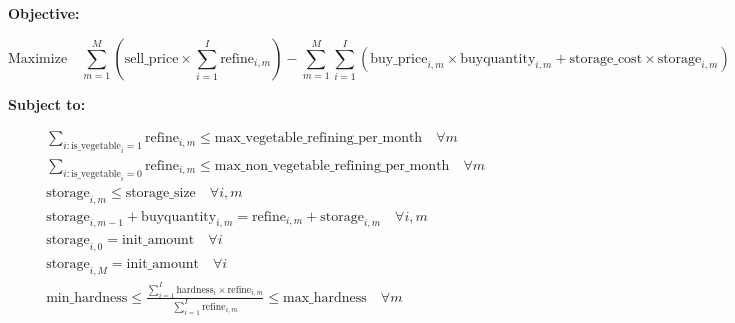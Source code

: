 \documentclass{article}
\begin{document}
\textbf{Objective:}

\[
\text{Maximize} \quad \sum_{m=1}^{M} \left( \text{sell\_price} \times \sum_{i=1}^{I} \text{refine}_{i,m} \right) - \sum_{m=1}^{M} \sum_{i=1}^{I} \left( \text{buy\_price}_{i,m} \times \text{buyquantity}_{i,m} + \text{storage\_cost} \times \text{storage}_{i,m} \right)
\]

\textbf{Subject to:}

\begin{align}
& \sum_{i: \text{is\_vegetable}_i = 1} \text{refine}_{i,m} \leq \text{max\_vegetable\_refining\_per\_month} \quad \forall m \\
& \sum_{i: \text{is\_vegetable}_i = 0} \text{refine}_{i,m} \leq \text{max\_non\_vegetable\_refining\_per\_month} \quad \forall m \\
& \text{storage}_{i,m} \leq \text{storage\_size} \quad \forall i, m \\
& \text{storage}_{i,m-1} + \text{buyquantity}_{i,m} = \text{refine}_{i,m} + \text{storage}_{i,m} \quad \forall i, m \\
& \text{storage}_{i,0} = \text{init\_amount} \quad \forall i \\
& \text{storage}_{i,M} = \text{init\_amount} \quad \forall i \\
& \text{min\_hardness} \leq \frac{\sum_{i=1}^{I} \text{hardness}_i \times \text{refine}_{i,m}}{\sum_{i=1}^{I} \text{refine}_{i,m}} \leq \text{max\_hardness} \quad \forall m
\end{align}
\end{document}
